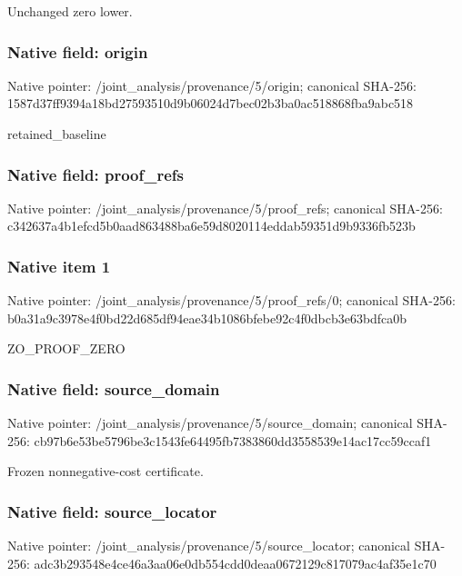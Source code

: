 \documentclass[10pt,a4paper]{article}
\begin{document}
\begingroup\raggedright\sloppy Unchanged zero lower.\par\endgroup

\subsubsection{Native field: origin}
Native pointer: /joint\_\allowbreak{}analysis/provenance/5/origin; canonical SHA-256: 1587d37ff9394a18bd27593510d9b06024d7bec02b3ba0ac518868fba9abc518

\begingroup\raggedright\sloppy retained\_\allowbreak{}baseline\par\endgroup

\subsubsection{Native field: proof\_\allowbreak{}refs}
Native pointer: /joint\_\allowbreak{}analysis/provenance/5/proof\_\allowbreak{}refs; canonical SHA-256: c342637a4b1efcd5b0aad863488ba6e59d8020114eddab59351d9b9336fb523b

\subsubsection{Native item 1}
Native pointer: /joint\_\allowbreak{}analysis/provenance/5/proof\_\allowbreak{}refs/0; canonical SHA-256: b0a31a9c3978e4f0bd22d685df94eae34b1086bfebe92c4f0dbcb3e63bdfca0b

\begingroup\raggedright\sloppy ZO\_\allowbreak{}PROOF\_\allowbreak{}ZERO\par\endgroup

\subsubsection{Native field: source\_\allowbreak{}domain}
Native pointer: /joint\_\allowbreak{}analysis/provenance/5/source\_\allowbreak{}domain; canonical SHA-256: cb97b6e53be5796be3c1543fe64495fb7383860dd3558539e14ac17cc59ccaf1

\begingroup\raggedright\sloppy Frozen nonnegative-cost certificate.\par\endgroup

\subsubsection{Native field: source\_\allowbreak{}locator}
Native pointer: /joint\_\allowbreak{}analysis/provenance/5/source\_\allowbreak{}locator; canonical SHA-256: adc3b293548e4ce46a3aa06e0db554cdd0deaa0672129c817079ac4af35e1c70
\end{document}
